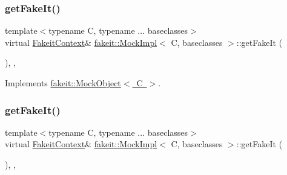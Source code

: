 \mbox{\label{classfakeit_1_1MockImpl_a1b51dd1918a32ec5d450fc804ad37e63}} 
\subsubsection{\texorpdfstring{getFakeIt()}{getFakeIt()}\hspace{0.1cm}{\footnotesize\ttfamily [1/9]}}
{\footnotesize\ttfamily template$<$typename C, typename ... baseclasses$>$ \\
virtual \mbox{\hyperlink{structfakeit_1_1FakeitContext}{Fakeit\+Context}}\& \mbox{\hyperlink{classfakeit_1_1MockImpl}{fakeit\+::\+Mock\+Impl}}$<$ C, baseclasses $>$\+::get\+Fake\+It (\begin{DoxyParamCaption}{ }\end{DoxyParamCaption})\hspace{0.3cm}{\ttfamily [inline]}, {\ttfamily [override]}, {\ttfamily [virtual]}}



Implements \mbox{\hyperlink{structfakeit_1_1MockObject_a26a2fa3fff133e8cb848b0757f58c6b6}{fakeit\+::\+Mock\+Object$<$ C $>$}}.

\mbox{\label{classfakeit_1_1MockImpl_a1b51dd1918a32ec5d450fc804ad37e63}} 
\subsubsection{\texorpdfstring{getFakeIt()}{getFakeIt()}\hspace{0.1cm}{\footnotesize\ttfamily [2/9]}}
{\footnotesize\ttfamily template$<$typename C, typename ... baseclasses$>$ \\
virtual \mbox{\hyperlink{structfakeit_1_1FakeitContext}{Fakeit\+Context}}\& \mbox{\hyperlink{classfakeit_1_1MockImpl}{fakeit\+::\+Mock\+Impl}}$<$ C, baseclasses $>$\+::get\+Fake\+It (\begin{DoxyParamCaption}{ }\end{DoxyParamCaption})\hspace{0.3cm}{\ttfamily [inline]}, {\ttfamily [override]}, {\ttfamily [virtual]}}



